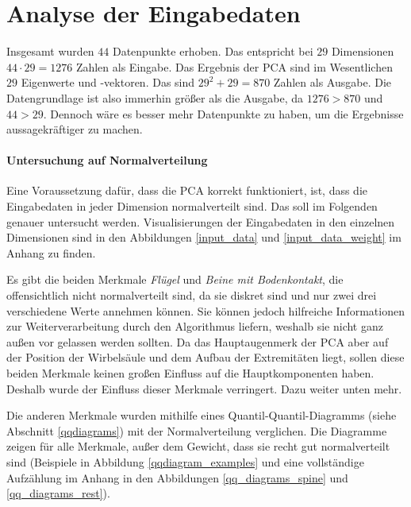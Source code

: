  
 \section{Analyse der Eingabedaten}
 \label{pca_input_analysis}
 
 Insgesamt wurden $44$ Datenpunkte erhoben. Das entspricht bei $29$ Dimensionen $44 \cdot 29 = 1276$ Zahlen als Eingabe. Das Ergebnis der PCA sind im Wesentlichen $29$ Eigenwerte und -vektoren. Das sind $29^2 + 29 = 870$ Zahlen als Ausgabe. Die Datengrundlage ist also immerhin größer als die Ausgabe, da $1276 > 870$ und $44 > 29$. Dennoch wäre es besser mehr Datenpunkte zu haben, um die Ergebnisse aussagekräftiger zu machen.
 
 \paragraph{Untersuchung auf Normalverteilung}
 Eine Voraussetzung dafür, dass die PCA korrekt funktioniert, ist, dass die Eingabedaten in jeder Dimension normalverteilt sind. Das soll im Folgenden genauer untersucht werden. Visualisierungen der Eingabedaten in den einzelnen Dimensionen sind in den Abbildungen \ref{input_data} und \ref{input_data_weight} im Anhang zu finden.
 
 Es gibt die beiden Merkmale \emph{Flügel} und \emph{Beine mit Bodenkontakt}, die offensichtlich nicht normalverteilt sind, da sie diskret sind und nur zwei \bzw drei verschiedene Werte annehmen können. Sie können jedoch hilfreiche Informationen zur Weiterverarbeitung durch den Algorithmus liefern, weshalb sie nicht ganz außen vor gelassen werden sollten. Da das Hauptaugenmerk der PCA aber auf der Position der Wirbelsäule und dem Aufbau der Extremitäten liegt, sollen diese beiden Merkmale keinen großen Einfluss auf die Hauptkomponenten haben. Deshalb wurde der Einfluss dieser Merkmale verringert. Dazu weiter unten mehr.
 
 Die anderen Merkmale wurden mithilfe eines Quantil-Quantil-Diagramms (siehe Abschnitt \ref{qqdiagrams}) mit der Normalverteilung verglichen.
 Die Diagramme zeigen für alle Merkmale, außer dem Gewicht, dass sie recht gut normalverteilt sind (Beispiele in Abbildung \ref{qqdiagram_examples} und eine vollständige Aufzählung im Anhang in den Abbildungen \ref{qq_diagrams_spine} und \ref{qq_diagrams_rest}).
 
